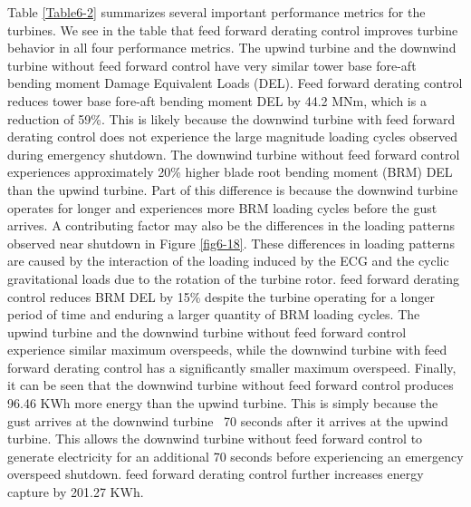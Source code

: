 Table \ref{Table6-2} summarizes several important performance metrics for the turbines. We see in the table that feed forward derating control improves turbine behavior in all four performance metrics. The upwind turbine and the downwind turbine without feed forward control have very similar tower base fore-aft bending moment Damage Equivalent Loads (DEL). Feed forward derating control reduces tower base fore-aft bending moment DEL by 44.2 MNm, which is a reduction of 59\%. This is likely because the downwind turbine with feed forward derating control does not experience the large magnitude loading cycles observed during emergency shutdown. The downwind turbine without feed forward control experiences approximately 20\% higher blade root bending moment (BRM) DEL than the upwind turbine. Part of this difference is because the downwind turbine operates for longer and experiences more BRM loading cycles before the gust arrives. A contributing factor may also be the differences in the loading patterns observed near shutdown in Figure \ref{fig6-18}. These differences in loading patterns are caused by the interaction of the loading induced by the ECG and the cyclic gravitational loads due to the rotation of the turbine rotor. feed forward derating control reduces BRM DEL by 15\% despite the turbine operating for a longer period of time and enduring a larger quantity of BRM loading cycles. The upwind turbine and the downwind turbine without feed forward control experience similar maximum overspeeds, while the downwind turbine with feed forward derating control has a significantly smaller maximum overspeed. Finally, it can be seen that the downwind turbine without feed forward control produces 96.46 KWh more energy than the upwind turbine. This is simply because the gust arrives at the downwind turbine ~70 seconds after it arrives at the upwind turbine. This allows the downwind turbine without feed forward control to generate electricity for an additional 70 seconds before experiencing an emergency overspeed shutdown. feed forward derating control further increases energy capture by 201.27 KWh.




